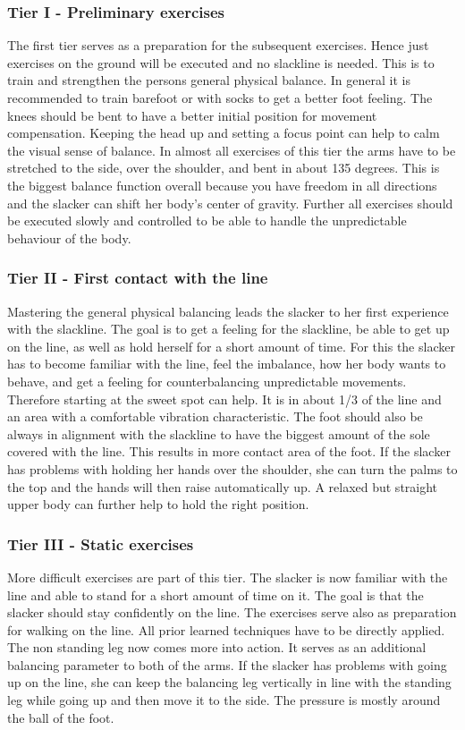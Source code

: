 \subsubsection{Tier I - Preliminary exercises}
The first tier serves as a preparation for the subsequent exercises. Hence just exercises on the ground will be executed and no slackline is needed. This is to train and strengthen the persons general physical balance. In general it is recommended to train barefoot or with socks to get a better foot feeling. The knees should be bent to have a better initial position for movement compensation. Keeping the head up and setting a focus point can help to calm the visual sense of balance. In almost all exercises of this tier the arms have to be stretched to the side, over the shoulder, and bent in about 135 degrees. This is the biggest balance function overall because you have freedom in all directions and the slacker can shift her body's center of gravity. Further all exercises should be executed slowly and controlled to be able to handle the unpredictable behaviour of the body.

\subsubsection{Tier II - First contact with the line}
Mastering the general physical balancing leads the slacker to her first experience with the slackline. The goal is to get a feeling for the slackline, be able to get up on the line, as well as hold herself for a short amount of time. For this the slacker has to become familiar with the line, feel the imbalance, how her body wants to behave, and get a feeling for counterbalancing unpredictable movements. Therefore starting at the sweet spot can help. It is in about 1/3 of the line and an area with a comfortable vibration characteristic. The foot should also be always in alignment with the slackline to have the biggest amount of the sole covered with the line. This results in more contact area of the foot. If the slacker has problems with holding her hands over the shoulder, she can turn the palms to the top and the hands will then raise automatically up. A relaxed but straight upper body can further help to hold the right position.

\subsubsection{Tier III - Static exercises}
More difficult exercises are part of this tier. The slacker is now familiar with the line and able to stand for a short amount of time on it. The goal is that the slacker should stay confidently on the line. The exercises serve also as preparation for walking on the line. All prior learned techniques have to be directly applied. The non standing leg now comes more into action. It serves as an additional balancing parameter to both of the arms. If the slacker has problems with going up on the line, she can keep the balancing leg vertically in line with the standing leg while going up and then move it to the side. The pressure is mostly around the ball of the foot.

